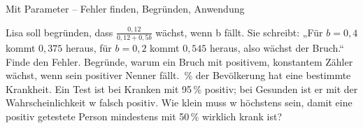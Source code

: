 \begin{aufgabe}{Mit Parameter – Fehler finden, Begründen, Anwendung}
\begin{teile}
\teil Lisa soll begründen, dass $\frac{0{,}12}{0{,}12 + 0{,}5b}$ wächst, wenn b fällt. Sie schreibt: „Für $b = 0{,}4$ kommt $0{,}375$ heraus, für $b = 0{,}2$ kommt $0{,}545$ heraus, also wächst der Bruch.“ Finde den Fehler.
\teil Begründe, warum ein Bruch mit positivem, konstantem Zähler wächst, wenn sein positiver Nenner fällt.
\,\% der Bevölkerung hat eine bestimmte Krankheit. Ein Test ist bei Kranken mit 95\,\% positiv; bei Gesunden ist er mit der Wahrscheinlichkeit w falsch positiv. Wie klein muss w höchstens sein, damit eine positiv getestete Person mindestens mit 50\,\% wirklich krank ist?
\end{teile}
\end{aufgabe}
